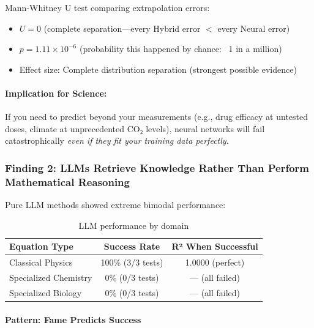 Mann-Whitney U test comparing extrapolation errors:
\begin{itemize}
    \item $U = 0$ (complete separation—every Hybrid error $<$ every Neural error)
    \item $p = 1.11 \times 10^{-6}$ (probability this happened by chance: ~1 in a million)
    \item Effect size: Complete distribution separation (strongest possible evidence)
\end{itemize}

\paragraph{Implication for Science:}

If you need to predict beyond your measurements (e.g., drug efficacy at untested doses, climate at unprecedented CO₂ levels), neural networks will fail catastrophically \emph{even if they fit your training data perfectly}.


\subsubsection{Finding 2: LLMs Retrieve Knowledge Rather Than Perform Mathematical Reasoning}

Pure LLM methods showed extreme bimodal performance:

\begin{table}[h]
\centering
\begin{tabular}{lcc}
\toprule
\textbf{Equation Type} & \textbf{Success Rate} & \textbf{R² When Successful} \\
\midrule
Classical Physics & 100\% (3/3 tests) & 1.0000 (perfect) \\
Specialized Chemistry & 0\% (0/3 tests) & --- (all failed) \\
Specialized Biology & 0\% (0/3 tests) & --- (all failed) \\
\bottomrule
\end{tabular}
\caption{LLM performance by domain}
\label{tab:llm_domain}
\end{table}

\paragraph{Pattern: Fame Predicts Success}

